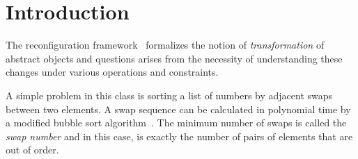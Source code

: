 \documentclass[msc,english,table,xcdraw]{ppgccufmg}
\begin{document}


\chapter{Introduction}
\label{chp:intro}


The reconfiguration framework~\cite{Ito:2011} formalizes the notion of \textit{transformation} of abstract objects and questions arises from the necessity of understanding these changes under various operations and constraints.


A simple problem in this class is sorting a list of numbers by adjacent swaps between two elements. A swap sequence can be calculated in polynomial time by a modified bubble sort algorithm~\cite{Knuth:1998}. The minimum number of swaps is called the \emph{swap number} and in this case, is exactly the number of pairs of elements that are out of order.
\end{document}
